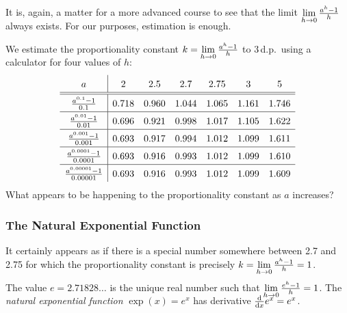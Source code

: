 It is, again, a matter for a more advanced course to see that the limit $\smash[b]{\lim\limits_{h\to 0}\frac{a^{h}-1}h}$ always exists. For our purposes, estimation is enough.


\begin{example}{}{}
	We estimate the proportionality constant $k=\smash[b]{\lim\limits_{h\to 0}\frac{a^{h}-1}h}$ to 3\,d.p.\ using a calculator for four values of $h$:
	\[
		\def\arraystretch{1.5}
		\begin{array}{c|cccccc}
			a&2&2.5&2.7&2.75&3&5\\\hline\hline
			\frac{a^{0.1}-1}{0.1}&0.718&0.960&1.044&1.065&1.161&1.746\\\hline
			\frac{a^{0.01}-1}{0.01}&0.696&0.921&0.998&1.017&1.105&1.622\\\hline
			\frac{a^{0.001}-1}{0.001}&0.693&0.917&0.994&1.012&1.099&1.611\\\hline
			\frac{a^{0.0001}-1}{0.0001}&0.693&0.916&0.993&1.012&1.099&1.610\\\hline
			\frac{a^{0.00001}-1}{0.00001}&0.693&0.916&0.993&1.012&1.099&1.609
		\end{array}
	\]
	What appears to be happening to the proportionality constant as $a$ increases?
\end{example}



\subsubsection*{The Natural Exponential Function}

It certainly appears as if there is a special number somewhere between 2.7 and 2.75 for which the proportionality constant is precisely $k=\smash[b]{\lim\limits_{h\to 0}\frac{a^{h}-1}h}=1$.


\begin{defn}{}{}
	The value $e=2.71828\ldots$ is the unique real number such that $\smash[b]{\lim\limits_{h\to 0}\frac{e^h-1}h =1}$.\smallbreak
	The \emph{natural\footnotemark{} exponential function} $\exp(x)=e^x$ has derivative $\frac{\mathrm{d} }{\mathrm{d} x}e^x=e^x$.
\end{defn}


